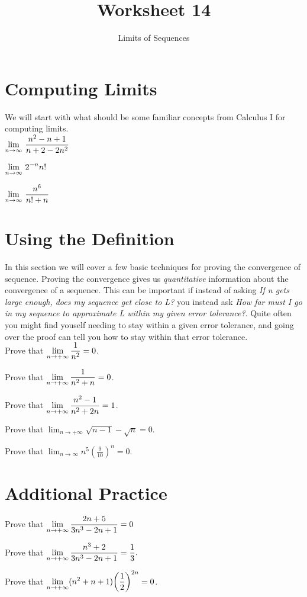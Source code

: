 \documentclass[paper=letter, 11pt]{article}
\title{Worksheet 14}
\subtitle{Limits of Sequences}
\begin{document}
\maketitle

\section*{Computing Limits}

We will start with what should be some familiar concepts from Calculus I for computing
limits.\\

\Prob $\displaystyle \lim_{n \to \infty}\, \frac{n^2 - n + 1}{n + 2 - 2n^2}$ \vfill

\Prob $\displaystyle \lim_{n \to \infty}\, 2^{-n}n!$\vfill

\Prob $\displaystyle \lim_{n \to \infty}\, \frac{n^6}{n! + n}$\vfill

\newpage

\section*{Using the Definition}

In this section we will cover a few basic techniques for proving the convergence
of sequence.  Proving the convergence gives us \emph{quantitative} information
about the convergence of a sequence.  This can be important if instead of asking
\emph{If n gets large enough, does my sequence get close to L?} you instead ask
\emph{How far must I go in my sequence to approximate L within my given error tolerance?}.
Quite often you might find youself needing to stay within a given error tolerance,
and going over the proof can tell you how to stay within that error tolerance.\\

\Prob Prove that $\displaystyle \lim_{n \to +\infty} \frac{1}{n^2} = 0$.\vfill

\Prob Prove that $\displaystyle \lim_{n \to +\infty} \frac{1}{n^2 + n} = 0$.\vfill

\Prob Prove that $\displaystyle \lim_{n \to +\infty} \frac{n^2 - 1}{n^2 + 2n} = 1$.\vfill

\newpage

\Prob Prove that $\lim_{n \to +\infty} \sqrt{n - 1} - \sqrt{n} = 0$.\vfill

\Prob Prove that $\lim_{n \to \infty} n^5 \left(\frac{9}{10}\right)^n = 0$.\vfill

\newpage

\section*{Additional Practice}

\Prob Prove that $\displaystyle \lim_{n \to +\infty} \frac{2n + 5}{3n^3 - 2n + 1} = 0$\vfill

\Prob Prove that $\displaystyle \lim_{n \to +\infty} \frac{n^3 + 2}{3n^3 - 2n + 1} = \frac{1}{3}.$\vfill

\Prob Prove that $\displaystyle \lim_{n \to +\infty} (n^2 + n + 1){\left(\frac{1}{2}\right)}^{2n} = 0$.\vfill
\end{document}
